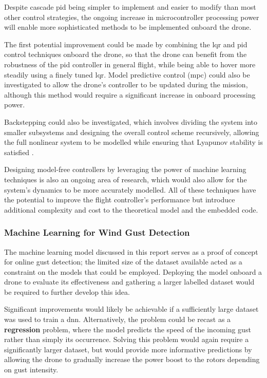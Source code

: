 Despite cascade \gls{pid} being simpler to implement and easier to modify than most other control strategies, the ongoing increase in microcontroller processing power will enable more sophisticated methods to be implemented onboard the drone. 

The first potential improvement could be made by combining the \gls{lqr} and \gls{pid} control techniques onboard the drone, so that the drone can benefit from the robustness of the \gls{pid} controller in general flight, while being able to hover more steadily using a finely tuned \gls{lqr}. Model predictive control (\acrshort{mpc}) could also be investigated to allow the drone's controller to be updated during the mission, although this method would require a significant increase in onboard processing power. 

Backstepping could also be investigated, which involves dividing the system into smaller subsystems and designing the overall control scheme recursively, allowing the full nonlinear system to be modelled while ensuring that Lyapunov stability is satisfied \cite{4058900}. 

Designing model-free controllers by leveraging the power of machine learning techniques is also an ongoing area of research, which would also allow for the system's dynamics to be more accurately modelled. All of these techniques have the potential to improve the flight controller's performance but introduce additional complexity and cost to the theoretical model and the embedded code.

\subsubsection{Machine Learning for Wind Gust Detection}

The machine learning model discussed in this report serves as a proof of concept for online gust detection; the limited size of the dataset available acted as a constraint on the models that could be employed. Deploying the model onboard a drone to evaluate its effectiveness and gathering a larger labelled dataset would be required to further develop this idea. 

Significant improvements would likely be achievable if a sufficiently large dataset was used to train a \gls{dnn}. Alternatively, the problem could be recast as a \textbf{regression} problem, where the model predicts the speed of the incoming gust rather than simply its occurrence. Solving this problem would again require a significantly larger dataset, but would provide more informative predictions by allowing the drone to gradually increase the power boost to the rotors depending on gust intensity.



